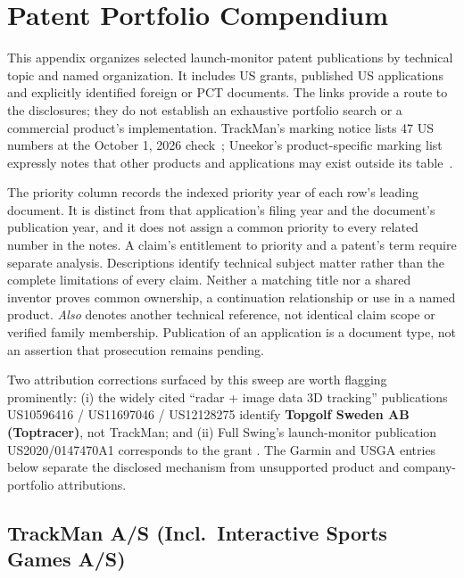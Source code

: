 \chapter{Patent Portfolio Compendium}
\label{app:patents}

This appendix organizes selected launch-monitor patent publications by technical topic and named organization.
It includes US grants, published US applications and explicitly identified foreign or PCT documents.
The links provide a route to the disclosures; they do not establish an exhaustive portfolio search or a commercial product's implementation.
TrackMan's marking notice lists 47 US numbers at the October 1, 2026 check~\cite{trackmanpatents}; Uneekor's product-specific marking list expressly notes that other products and applications may exist outside its table~\cite{uneekorpatents}.

The priority column records the indexed priority year of each row's leading document.
It is distinct from that application's filing year and the document's publication year, and it does not assign a common priority to every related number in the notes.
A claim's entitlement to priority and a patent's term require separate analysis.
Descriptions identify technical subject matter rather than the complete limitations of every claim.
Neither a matching title nor a shared inventor proves common ownership, a continuation relationship or use in a named product.
\emph{Also} denotes another technical reference, not identical claim scope or verified family membership.
Publication of an application is a document type, not an assertion that prosecution remains pending.

Two attribution corrections surfaced by this sweep are worth flagging prominently: (i) the widely cited ``radar + image data 3D tracking'' publications US10596416 / US11697046 / US12128275 identify \textbf{Topgolf Sweden AB (Toptracer)}, not TrackMan; and (ii) Full Swing's launch-monitor publication US2020/0147470A1 corresponds to the grant .
The Garmin and USGA entries below separate the disclosed mechanism from unsupported product and company-portfolio attributions.

\section{TrackMan A/S (Incl.\ Interactive Sports Games A/S)}

